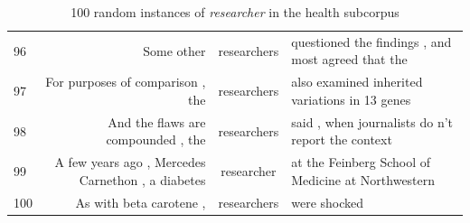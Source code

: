 {\begin{table}
\begin{tabular}{|lrcl|}
96 &  Some other                                         & researchers & questioned the findings , and most agreed that the \\
97 &  For purposes of comparison , the                   & researchers & also examined inherited variations in 13 genes     \\
98 &  And the flaws are compounded , the                 & researchers & said , when journalists do n't report the context  \\
99 &  A few years ago , Mercedes Carnethon , a diabetes  & researcher  & at the Feinberg School of Medicine at Northwestern \\
100 &  As with beta carotene ,                            & researchers & were shocked                                       \\
\hline
\end{tabular}
\caption{100 random instances of \emph{researcher} in the health subcorpus}
\label{tab:research}
\end{table}
\clearpage
}